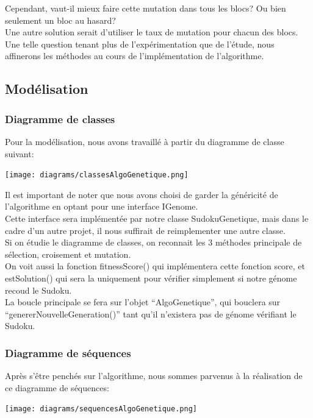                Cependant, vaut-il mieux faire cette mutation dans tous les blocs? Ou bien seulement un bloc au hasard?\\
                Une autre solution serait d'utiliser le taux de mutation pour chacun des blocs.\\

                Une telle question tenant plus de l'expérimentation que de l'étude, nous affinerons les méthodes au cours de l'implémentation de l'algorithme.
        \subsection{Modélisation}
            \subsubsection{Diagramme de classes}
                Pour la modélisation, nous avons travaillé à partir du diagramme de classe suivant:
                \begin{center}
                    \texttt{[image: diagrams/classesAlgoGenetique.png]}
                \end{center}

                Il est important de noter que nous avons choisi de garder la généricité de l'algorithme en optant pour une interface IGenome.\\
                Cette interface sera implémentée par notre classe SudokuGenetique, mais dans le cadre d'un autre projet, il nous suffirait de reimplementer une autre classe.\\

                Si on étudie le diagramme de classes, on reconnait les 3 méthodes principale de sélection, croisement et mutation.\\
                On voit aussi la fonction fitnessScore() qui implémentera cette fonction score, et estSolution() qui sera la uniquement pour vérifier simplement si notre génome recoud le Sudoku.\\

                La boucle principale se fera sur l'objet ``AlgoGenetique'', qui bouclera sur ``genererNouvelleGeneration()'' tant qu'il n'existera pas de génome vérifiant le Sudoku.
            \subsubsection{Diagramme de séquences}
                Après s'être penchés sur l'algorithme, nous sommes parvenus à la réalisation de ce diagramme de séquences:
                \begin{center}
                    \texttt{[image: diagrams/sequencesAlgoGenetique.png]}
                \end{center}


